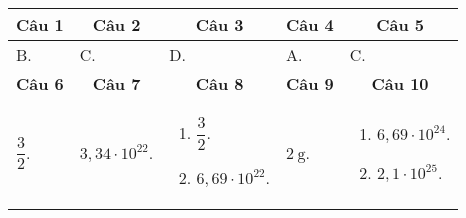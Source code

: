 \begin{longtable}[\textwidth]{|m{}|m{}|m{}|m{}|m{}|}
	\hline%
	\multicolumn{1}{|c}{\textbf{Câu 1}} &
	\multicolumn{1}{|c|}{\textbf{Câu 2}}& 
	\multicolumn{1}{c|}{\textbf{Câu 3}} &
	\multicolumn{1}{c|}{\textbf{Câu 4}} &
	\multicolumn{1}{c|}{\textbf{Câu 5}} \\
	\hline
	B. &
	C. &
	D. &
	A. &
	C.
	\\
	\hline
	\multicolumn{1}{|c}{\textbf{Câu 6}} &
	\multicolumn{1}{|c|}{\textbf{Câu 7}}& 
	\multicolumn{1}{c|}{\textbf{Câu 8}} &
	\multicolumn{1}{c|}{\textbf{Câu 9}} &
	\multicolumn{1}{c|}{\textbf{Câu 10}} \\
	\hline
	$\dfrac{3}{2}$.&
	$3,34\cdot 10^{22}$.&
	\begin{enumerate}[label=\alph*)]
		\item $\dfrac{3}{2}$.
		\item $6,69\cdot 10^{22}$.
	\end{enumerate} &
	$\SI{2}{\gram}$. &
	\begin{enumerate}[label=\alph*)]
		\item $6,69\cdot 10^{24}$.
		\item $2,1\cdot 10^{25}$.
	\end{enumerate} 
	\\
	\hline
\end{longtable}



